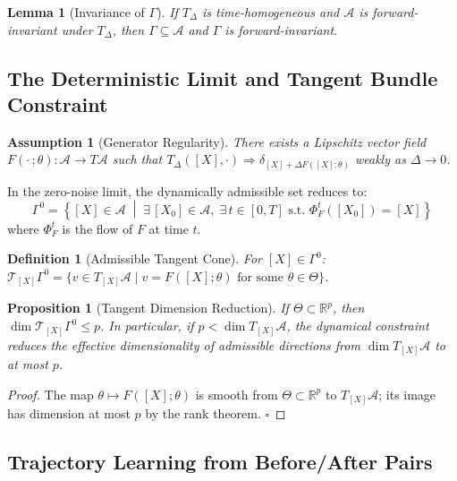 \documentclass[11pt, oneside]{article}
\newtheorem{lemma}[theorem]{Lemma}
\newtheorem{proposition}[theorem]{Proposition}
\newtheorem{definition}[theorem]{Definition}
\newtheorem{assumption}[theorem]{Assumption}
\begin{document}
\begin{lemma}[Invariance of $\Gamma$]
If $T_\Delta$ is time-homogeneous and $\mathcal{A}$ is forward-invariant under $T_\Delta$,
then $\Gamma \subseteq \mathcal{A}$ and $\Gamma$ is forward-invariant.
\end{lemma}

\subsection{The Deterministic Limit and Tangent Bundle Constraint}

\begin{assumption}[Generator Regularity]
\label{ass:generator}
There exists a Lipschitz vector field $F(\cdot\,;\theta) : \mathcal{A} \to T\mathcal{A}$
such that $T_\Delta([X],\cdot) \Rightarrow \delta_{[X]+\Delta F([X];\theta)}$ weakly as
$\Delta \to 0$.
\end{assumption}

In the zero-noise limit, the dynamically admissible set reduces to:
\[
\Gamma^0 = \left\{ [X] \in \mathcal{A} \;\middle|\;
\exists\, [X_0] \in \mathcal{A},\; \exists\, t \in [0,T] \text{ s.t. }
\Phi^t_F([X_0]) = [X] \right\}
\]
where $\Phi^t_F$ is the flow of $F$ at time $t$.

\begin{definition}[Admissible Tangent Cone]
For $[X] \in \Gamma^0$:
$\mathcal{T}_{[X]}\Gamma^0 = \{v \in T_{[X]}\mathcal{A} \mid v = F([X];\theta)
\text{ for some } \theta \in \Theta\}$.
\end{definition}

\begin{proposition}[Tangent Dimension Reduction]
If $\Theta \subset \mathbb{R}^p$, then $\dim \mathcal{T}_{[X]}\Gamma^0 \le p$.
In particular, if $p < \dim T_{[X]}\mathcal{A}$, the dynamical constraint reduces the
effective dimensionality of admissible directions from $\dim T_{[X]}\mathcal{A}$ to
at most $p$.
\end{proposition}
\begin{proof}
The map $\theta \mapsto F([X];\theta)$ is smooth from $\Theta \subset \mathbb{R}^p$ to
$T_{[X]}\mathcal{A}$; its image has dimension at most $p$ by the rank theorem. $\square$
\end{proof}

\subsection{Trajectory Learning from Before/After Pairs}
\end{document}

